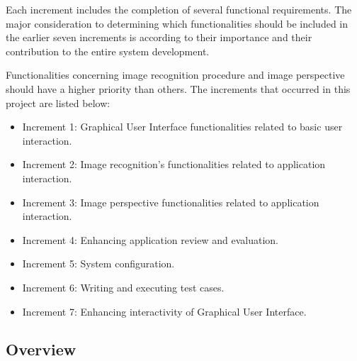 \par Each increment includes the completion of several functional requirements. The major consideration to determining which functionalities should be included in the earlier seven increments is according to their importance and their contribution to the entire system development.
\par Functionalities concerning image recognition procedure  and image perspective should have a higher priority than others. The increments that occurred in this project are listed below:
\begin{itemize}
\item Increment 1: Graphical User Interface functionalities related to basic user interaction.
\item Increment 2: Image recognition's functionalities related to application interaction.
\item Increment 3: Image perspective functionalities related to application interaction.
\item Increment 4: Enhancing application review and evaluation.
\item Increment 5: System configuration.
\item Increment 6: Writing and executing test cases.
\item Increment 7: Enhancing interactivity of Graphical User Interface.
\end{itemize}

\subsection{Overview} 
